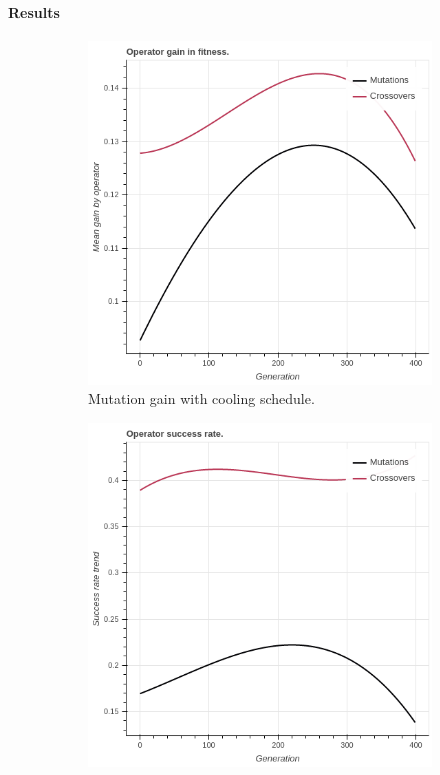 \paragraph{Results}
\begin{figure}
    \centering
    \begin{subfigure}{0.6\textwidth}
    \centering
        \includegraphics[width=0.8\linewidth]{figures/coolinggain.png}
        \caption{Mutation gain with cooling schedule.}
    \end{subfigure}%
    \begin{subfigure}{0.6\textwidth}
    \centering
        \includegraphics[width=0.8\linewidth]{figures/coolingrate.png}

\end{subfigure}
\end{figure}
